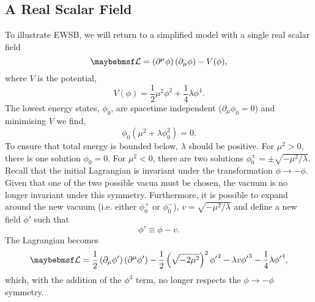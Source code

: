 \subsection{A Real Scalar Field}
To illustrate \ac{EWSB}, we will return to a simplified model with a single real
scalar field
\begin{equation*}
\lagrangiand = \left(\partial^{\mu}\phi\right)\left(\partial_{\mu}\phi\right)
-V(\phi),
\end{equation*}
where $V$ is the potential,
\begin{equation*}
V(\phi) = \frac{1}{2}\mu^2\phi^2 + \frac{1}{4}\lambda\phi^4.
\end{equation*}
The lowest energy states, $\phi_0$, are spacetime independent ($\partial_{\mu}
\phi_0 = 0$) and minimising $V$ we find,
\begin{equation*}
\phi_0 \left (\mu^2 + \lambda\phi_0^2\right) = 0.
\end{equation*}
To ensure that total energy is bounded below, $\lambda$ should be positive. For
$\mu^2 > 0$, there is one solution $\phi_0 = 0$. For $\mu^2 < 0$, there are two
solutions $\phi^\pm_0 = \pm \sqrt{-\mu^2/\lambda}$. Recall that the initial
Lagrangian is invariant under the transformation $\phi \longrightarrow
-\phi$. Given that one of the two possible vacua must be chosen, the vacuum is
no longer invariant under this symmetry. Furthermore, it is possible to expand
around the new vacuum (i.e. either $\phi_0^+$ or $\phi_0^-$),
$v=\sqrt{-\mu^2/\lambda}$ and define a new field $\phi'$ such that
\begin{equation*}
\phi' \equiv \phi - v.
\end{equation*}
The Lagrangian becomes
\begin{equation*}
\lagrangiand = \frac{1}{2}
\left(\partial_{\mu}\phi'\right)\left(\partial^{\mu}\phi'\right)
-\frac{1}{2}\left(\sqrt{-2\mu^2}\right)^2{\phi'}^2 - \lambda v {\phi'}^3
-\frac{1}{4}\lambda{\phi'}^4,
\end{equation*}
which, with the addition of the $\phi^3$ term, no longer respects the $\phi
\longrightarrow -\phi$ symmetry.

